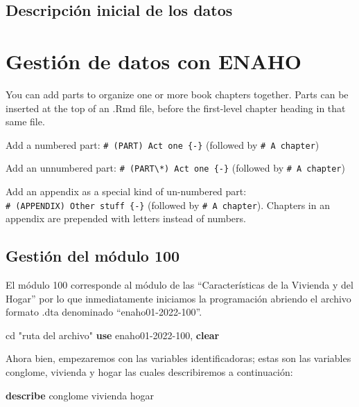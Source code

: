 \documentclass[
]{book}
\newenvironment{Shaded}{\begin{snugshade}}{\end{snugshade}}
\newcommand{\KeywordTok}[1]{\textcolor[rgb]{0.13,0.29,0.53}{\textbf{#1}}}
\newcommand{\NormalTok}[1]{#1}
\newcommand{\StringTok}[1]{\textcolor[rgb]{0.31,0.60,0.02}{#1}}
\theoremstyle{definition}
\theoremstyle{definition}
\theoremstyle{definition}
\theoremstyle{definition}
\theoremstyle{remark}
\begin{document}
\hypertarget{descripciuxf3n-inicial-de-los-datos}{%
\section{Descripción inicial de los datos}\label{descripciuxf3n-inicial-de-los-datos}}

\hypertarget{gestiuxf3n-de-datos-con-enaho}{%
\chapter{Gestión de datos con ENAHO}\label{gestiuxf3n-de-datos-con-enaho}}

You can add parts to organize one or more book chapters together. Parts can be inserted at the top of an .Rmd file, before the first-level chapter heading in that same file.

Add a numbered part: \texttt{\#\ (PART)\ Act\ one\ \{-\}} (followed by \texttt{\#\ A\ chapter})

Add an unnumbered part: \texttt{\#\ (PART\textbackslash{}*)\ Act\ one\ \{-\}} (followed by \texttt{\#\ A\ chapter})

Add an appendix as a special kind of un-numbered part: \texttt{\#\ (APPENDIX)\ Other\ stuff\ \{-\}} (followed by \texttt{\#\ A\ chapter}). Chapters in an appendix are prepended with letters instead of numbers.

\hypertarget{gestiuxf3n-del-muxf3dulo-100}{%
\section{Gestión del módulo 100}\label{gestiuxf3n-del-muxf3dulo-100}}

El módulo 100 corresponde al módulo de las ``Características de la Vivienda y del Hogar'' por lo que inmediatamente iniciamos la programación abriendo el archivo formato .dta denominado ``enaho01-2022-100''.

\begin{Shaded}
\begin{Highlighting}[]
\NormalTok{cd }\StringTok{"ruta del archivo"}
\KeywordTok{use}\NormalTok{ enaho01{-}2022{-}100, }\KeywordTok{clear}
\end{Highlighting}
\end{Shaded}

Ahora bien, empezaremos con las variables identificadoras; estas son las variables conglome, vivienda y hogar las cuales describiremos a continuación:

\begin{Shaded}
\begin{Highlighting}[]
\KeywordTok{describe}\NormalTok{ conglome vivienda hogar}
\end{Highlighting}
\end{Shaded}
\end{document}
